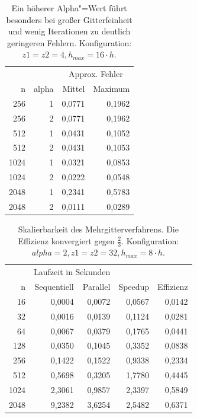 \documentclass[paper = a4]{scrartcl}
\begin{document}
\begin{table}
    \centering
    \begin{tabular}{|r|r|r|r|} \hline
    & & \multicolumn{2}{c|}{Approx. Fehler} \\
    n    & alpha & Mittel & Maximum \\ \hline \hline
    256  & 1     & 0,0771 & 0,1962  \\
    256  & 2     & 0,0771 & 0,1962  \\
    512  & 1     & 0,0431 & 0,1052  \\
    512  & 2     & 0,0431 & 0,1053  \\
    1024 & 1     & 0,0321 & 0,0853  \\
    1024 & 2     & 0,0222 & 0,0548  \\
    2048 & 1     & 0,2341 & 0,5783  \\
    2048 & 2     & 0,0111 & 0,0289  \\ \hline
    \end{tabular}
    \caption{Ein höherer Alpha"=Wert führt besonders bei großer Gitterfeinheit und wenig Iterationen zu deutlich geringeren Fehlern. Konfiguration: \(z1=z2=4, h_{max} = 16 \cdot h\).}
    \label{tab:c}
\end{table}

\begin{table}
    \centering
    \begin{tabular}{|r|r|r|r|r|} \hline
    & \multicolumn{2}{c|}{Laufzeit in Sekunden} & & \\
    n    & Sequentiell & Parallel & Speedup & Effizienz \\ \hline \hline
    16   & 0,0004      & 0,0072   & 0,0567  & 0,0142    \\
    32   & 0,0016      & 0,0139   & 0,1124  & 0,0281    \\
    64   & 0,0067      & 0,0379   & 0,1765  & 0,0441    \\
    128  & 0,0350      & 0,1045   & 0,3352  & 0,0838    \\
    256  & 0,1422      & 0,1522   & 0,9338  & 0,2334    \\
    512  & 0,5698      & 0,3205   & 1,7780  & 0,4445    \\
    1024 & 2,3061      & 0,9857   & 2,3397  & 0,5849    \\
    2048 & 9,2382      & 3,6254   & 2,5482  & 0,6371    \\ \hline
    \end{tabular}
    \caption{Skalierbarkeit des Mehrgitterverfahrens. Die Effizienz konvergiert gegen \(\frac{2}{3}\). Konfiguration: \(alpha=2, z1=z2=32, h_{max} = 8 \cdot h\).}
    \label{tab:e}
\end{table}
\end{document}
